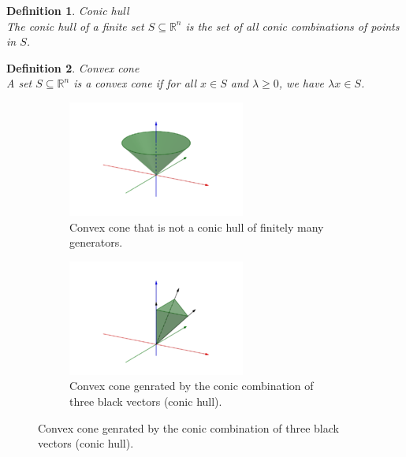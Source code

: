 \documentclass[11pt]{book} %
\newtheorem{definition}{Definition}[section]
\begin{document}
\begin{definition}{Conic hull} \\
The conic hull of a finite set $S \subseteq \mathbb{R}^n$ is the set of all conic combinations of points in $S$.
\end{definition}


\begin{definition}{Convex cone} \\
A set $S \subseteq \mathbb{R}^n$ is a convex cone if for all $x \in S$ and $\lambda \geq 0$, we have $\lambda x \in S$.
\end{definition}

\begin{figure}[H]
    \begin{subfigure}{0.5\textwidth}
        \centering
        \includegraphics[width=\linewidth]{Figs/circular-pyramid.png}
        \caption{Convex cone that is not a conic hull of finitely many generators.}
    \end{subfigure}
    \begin{subfigure}{0.5\textwidth}
        \centering
        \includegraphics[width=\linewidth]{Figs/polyhedral_cone.png}
        \caption{Convex cone genrated by the conic combination of three black vectors (conic hull).}
    \end{subfigure}
\end{figure}
\end{document}
